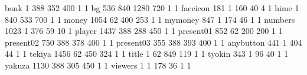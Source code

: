 bank 1 388 352 400 1 1
bg 536 840 1280 720 1 1
faceicon 181 1 160 40 4 1
hime 1 840 533 700 1 1
money 1054 62 400 253 1 1
mymoney 847 1 174 46 1 1
numbers 1023 1 376 59 10 1
player 1437 388 288 450 1 1
present01 852 62 200 200 1 1
present02 750 388 378 400 1 1
present03 355 388 393 400 1 1
anybutton 441 1 404 44 1 1
tekiya 1456 62 450 324 1 1
title 1 62 849 119 1 1
tyokin 343 1 96 40 1 1
yakuza 1130 388 305 450 1 1
viewers 1 1 178 36 1 1